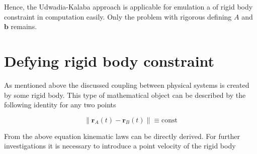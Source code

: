 Hence, the Udwadia-Kalaba approach is applicable for emulation a of 
rigid body constraint in computation easily. Only the problem with rigorous 
defining $A$ and $\mathbf{b}$ remains.

\section{Defying rigid body constraint}

As mentioned above the discussed coupling between physical systems is created 
by some rigid body. This type of mathematical object can be described by the 
following identity for any two points

\begin{equation}
    \| \mathbf{r}_A(t) - \mathbf{r}_B(t) \| \equiv \text{const}
    \label{eqn:rigid_body_axiom}
\end{equation}

From the above equation kinematic laws can be directly derived. For further 
investigations it is necessary to introduce a point velocity of the rigid body

